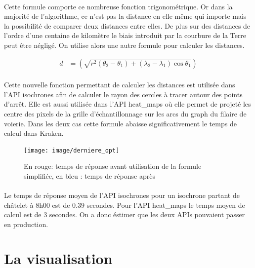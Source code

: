\documentclass[a4paper]{report}
\begin{document}
\paragraph{} Cette formule comporte ce nombreuse fonction trigonométrique. Or dans la majorité de l'algorithme, ce n'est pas la distance en elle même qui importe mais la possibilité de comparer deux distances entre elles. De plus sur des distances de l'ordre d'une centaine de kilomètre le biais introduit par la courbure de la Terre peut être négligé. On utilise alors une autre formule pour calculer les distances.

\begin{align}
	d &= \left(\sqrt{r^2\left(\theta_{2} - \theta_{1}\right)+\left(\lambda_{2} - \lambda_{1}\right)\cos\theta_{1}}\right)
\end{align}

\paragraph{} Cette nouvelle fonction permettant de calculer les distances est utilisée dans l'API isochrones afin de calculer le rayon des cercles à tracer autour des points d'arrêt. Elle est aussi utilisée dans l'API heat\_maps où elle permet de projeté les centre des pixels de la grille d'échantillonnage sur les arcs du graph du filaire de voierie. Dans les deux cas cette formule abaisse significativement le temps de calcul dans Kraken. 

\begin{figure}[H]
	\begin{center}
		\texttt{[image: image/derniere\_opt]}
		\caption{En rouge: temps de réponse avant utilisation de la formule simplifiée, en bleu : temps de réponse après}
		\label{Temps de réponse après utilisation de la formule simplifiée}
	\end{center}
\end{figure}

\paragraph{} Le temps de réponse moyen de l'API isochrones pour un isochrone partant de châtelet à 8h00 est de $0.39$ secondes.  Pour l'API heat\_maps le temps moyen de calcul est de $3$ secondes. On a donc éstimer que les deux APIs pouvaient passer en production.

\section{La visualisation}
\end{document}
